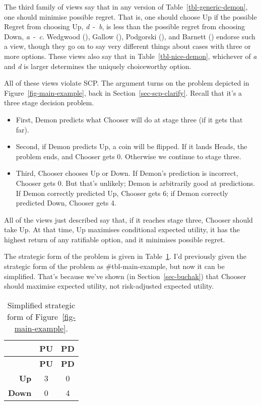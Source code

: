\documentclass[
  10pt,
  letterpaper,
  DIV=11,
  numbers=noendperiod,
  twoside]{scrartcl}
\providecommand{\tightlist}{%
  \setlength{\itemsep}{0pt}\setlength{\parskip}{0pt}}\usepackage{longtable,booktabs,array}
\begin{document}
The third family of views say that in any version of
Table~\ref{tbl-generic-demon}, one should minimise possible regret. That
is, one should choose Up if the possible Regret from choosing Up,
\emph{d}~-~\emph{b}, is less than the possible regret from choosing
Down, \emph{a}~-~\emph{c}. Wedgwood
(), Gallow
(), Podgorski
(), and Barnett
() endorse such a view, though they go
on to say very different things about cases with three or more options.
These views also say that in Table~\ref{tbl-nice-demon}, whichever of
\emph{a} and \emph{d} is larger determines the uniquely choiceworthy
option.

All of these views violate SCP. The argument turns on the problem
depicted in Figure~\ref{fig-main-example}, back in
Section~\ref{sec-scp-clarify}. Recall that it's a three stage decision
problem.

\begin{itemize}
\tightlist
\item
  First, Demon predicts what Chooser will do at stage three (if it gets
  that far).
\item
  Second, if Demon predicts Up, a coin will be flipped. If it lands
  Heads, the problem ends, and Chooser gets 0. Otherwise we continue to
  stage three.
\item
  Third, Chooser chooses Up or Down. If Demon's prediction is incorrect,
  Chooser gets 0. But that's unlikely; Demon is arbitrarily good at
  predictions. If Demon correctly predicted Up, Chooser gets 6; if Demon
  correctly predicted Down, Chooser gets 4.
\end{itemize}

All of the views just described say that, if it reaches stage three,
Chooser should take Up. At that time, Up maximises conditional expected
utility, it has the highest return of any ratifiable option, and it
minimises possible regret.

The strategic form of the problem is given in
Table~\ref{tbl-main-example-simple}. I'd previously given the strategic
form of the problem as \#tbl-main-example, but now it can be simplified.
That's because we've shown (in Section~\ref{sec-buchak}) that Chooser
should maximise expected utility, not risk-adjusted expected utility.

\begin{longtable}[]{@{}rcc@{}}
\caption{Simplified strategic form of
Figure~\ref{fig-main-example}.}\label{tbl-main-example-simple}\tabularnewline
\toprule\noalign{}
& \textbf{PU} & \textbf{PD} \\
\midrule\noalign{}
\endfirsthead
\toprule\noalign{}
& \textbf{PU} & \textbf{PD} \\
\midrule\noalign{}
\endhead
\bottomrule\noalign{}
\endlastfoot
\textbf{Up} & 3 & 0 \\
\textbf{Down} & 0 & 4 \\
\end{longtable}
\end{document}

